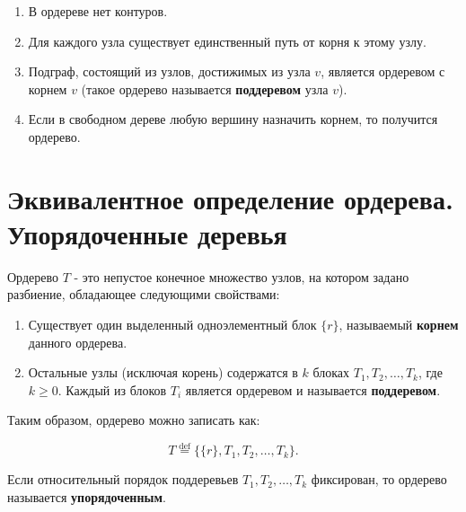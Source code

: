 {\begin{enumerate}
  \item В ордереве нет контуров.

  \item Для каждого узла существует единственный путь от корня к этому узлу.

  \item Подграф, состоящий из узлов, достижимых из узла $v$, является ордеревом с корнем $v$ (такое ордерево называется \textbf{поддеревом} узла $v$).

  \item Если в свободном дереве любую вершину назначить корнем, то получится ордерево.
\end{enumerate}

\section*{Эквивалентное определение ордерева.
Упорядоченные деревья}

Ордерево $T$ - это непустое конечное множество узлов, на котором задано разбиение, обладающее следующими свойствами:

\begin{enumerate}
  \item Существует один выделенный одноэлементный блок $\{r\}$, называемый \textbf{корнем} данного ордерева.

  \item Остальные узлы (исключая корень) содержатся в $k$ блоках $T_1, T_2, \ldots, T_k$, где $k \ge 0$.  
  Каждый из блоков $T_i$ является ордеревом и называется \textbf{поддеревом}.
\end{enumerate}

Таким образом, ордерево можно записать как:


\[
T \overset{\text{def}}{=} \{\{r\}, T_1, T_2, \ldots, T_k\}.
\]



Если относительный порядок поддеревьев $T_1, T_2, \ldots, T_k$ фиксирован, то ордерево называется \textbf{упорядоченным}.


    \newpage
}
